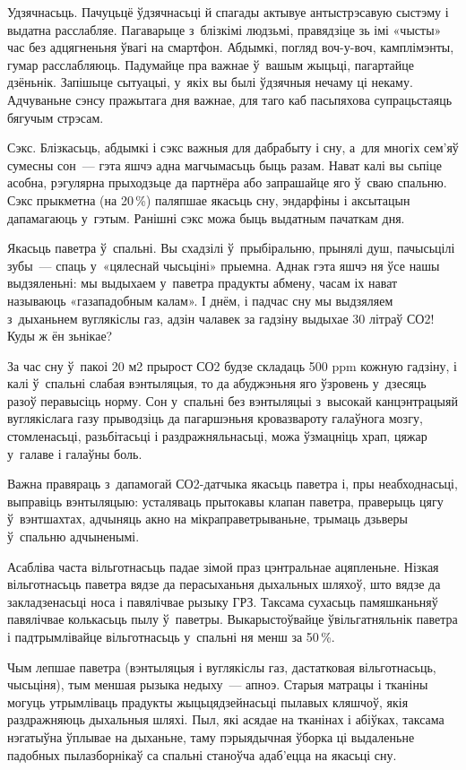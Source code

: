 Удзячнасьць. Пачуцьцё ўдзячнасьці й спагады актывуе антыстрэсавую сыстэму і выдатна расслабляе. Пагаварыце з~блізкімі людзьмі, правядзіце зь імі «чысты» час без адцягненьня ўвагі на смартфон. Абдымкі, погляд воч-у-воч, камплімэнты, гумар расслабляюць. Падумайце пра важнае ў~вашым жыцьці, пагартайце дзёньнік. Запішыце сытуацыі, у~якіх вы былі ўдзячныя нечаму ці некаму. Адчуваньне сэнсу пражытага дня важнае, для таго каб пасьпяхова супрацьстаяць бягучым стрэсам.

Сэкс. Блізкасьць, абдымкі і сэкс важныя для дабрабыту і сну, а~для многіх сем'яў сумесны сон~--- гэта яшчэ адна магчымасьць быць разам. Нават калі вы сьпіце асобна, рэгулярна прыходзьце да партнёра або запрашайце яго ў~сваю спальню. Сэкс прыкметна (на 20\,\%) паляпшае якасьць сну, эндарфіны і аксытацын дапамагаюць у~гэтым. Ранішні сэкс можа быць выдатным пачаткам дня.

Якасьць паветра ў~спальні. Вы схадзілі ў~прыбіральню, прынялі душ, пачысьцілі зубы~--- спаць у~«цялеснай чысьціні» прыемна. Аднак гэта яшчэ ня ўсе нашы выдзяленьні: мы выдыхаем у~паветра прадукты абмену, часам іх нават называюць «газападобным калам». І днём, і падчас сну мы выдзяляем з~дыханьнем вуглякіслы газ, адзін чалавек за гадзіну выдыхае 30 літраў СО2! Куды ж ён зьнікае?

За час сну ў~пакоі 20 м2 прырост СО2 будзе складаць 500 ppm кожную гадзіну, і калі ў~спальні слабая вэнтыляцыя, то да абуджэньня яго ўзровень у~дзесяць разоў перавысіць норму. Сон у~спальні без вэнтыляцыі з~высокай канцэнтрацыяй вуглякіслага газу прыводзіць да пагаршэньня кровазвароту галаўнога мозгу, стомленасьці, разьбітасьці і раздражняльнасьці, можа ўзмацніць храп, цяжар у~галаве і галаўны боль.

Важна правяраць з~дапамогай СО2-датчыка якасьць паветра і, пры неабходнасьці, выправіць вэнтыляцыю: усталяваць прытокавы клапан паветра, праверыць цягу ў~вэнтшахтах, адчыняць акно на мікраправетрываньне, трымаць дзьверы ў~спальню адчыненымі.

Асабліва часта вільготнасьць падае зімой праз цэнтральнае ацяпленьне. Нізкая вільготнасьць паветра вядзе да перасыханьня дыхальных шляхоў, што вядзе да закладзенасьці носа і павялічвае рызыку ГРЗ. Таксама сухасьць памяшканьняў павялічвае колькасьць пылу ў~паветры. Выкарыстоўвайце ўвільгатняльнік паветра і падтрымлівайце вільготнасьць у~спальні ня менш за 50\,\%.

Чым лепшае паветра (вэнтыляцыя і вуглякіслы газ, дастатковая вільготнасьць, чысьціня), тым меншая рызыка недыху~--- апноэ. Старыя матрацы і тканіны могуць утрымліваць прадукты жыцьцядзейнасьці пылавых кляшчоў, якія раздражняюць дыхальныя шляхі. Пыл, які асядае на тканінах і абіўках, таксама нэгатыўна ўплывае на дыханьне, таму пэрыядычная ўборка ці выдаленьне падобных пылазборнікаў са спальні станоўча адаб'ецца на якасьці сну.

